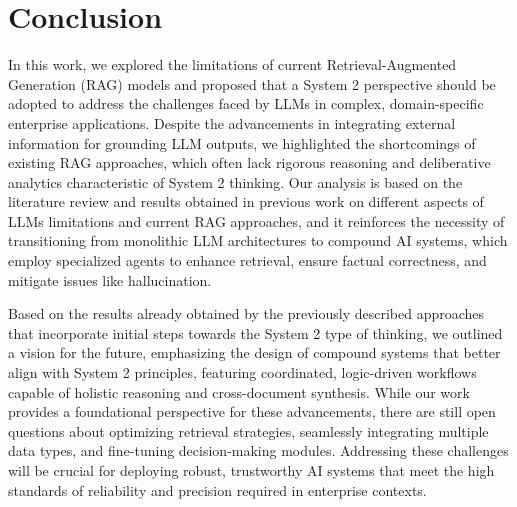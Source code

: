\section{Conclusion}

In this work, we explored the limitations of current Retrieval-Augmented Generation (RAG) models and proposed that a System 2 perspective should be adopted to address the challenges faced by LLMs in complex, domain-specific enterprise applications. Despite the advancements in integrating external information for grounding LLM outputs, we highlighted the shortcomings of existing RAG approaches, which often lack rigorous reasoning and deliberative analytics characteristic of System 2 thinking. Our analysis is based on the literature review and results obtained in previous work on different aspects of LLMs limitations and current RAG approaches, and it reinforces the necessity of transitioning from monolithic LLM architectures to compound AI systems, which employ specialized agents to enhance retrieval, ensure factual correctness, and mitigate issues like hallucination.

Based on the results already obtained by the previously described approaches that incorporate initial steps towards the System 2 type of thinking, we outlined a vision for the future, emphasizing the design of compound systems that better align with System 2 principles, featuring coordinated, logic-driven workflows capable of holistic reasoning and cross-document synthesis. While our work provides a foundational perspective for these advancements, there are still open questions about optimizing retrieval strategies, seamlessly integrating multiple data types, and fine-tuning decision-making modules. Addressing these challenges will be crucial for deploying robust, trustworthy AI systems that meet the high standards of reliability and precision required in enterprise contexts.